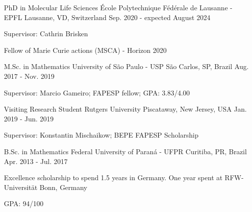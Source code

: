 

\begin{cventries}

  \cventry
    {PhD in Molecular Life Sciences} %
    {École Polytechnique Fédérale de Lausanne - EPFL} %
    {Lausanne, VD, Switzerland} %
    {Sep. 2020 - expected August 2024}
    {\begin{cvitems}
        \item{Supervisor: Cathrin Brisken}
        \item{Fellow of Marie Curie actions (MSCA) - Horizon 2020}
     \end{cvitems}
    }


  \cventry
    {M.Sc. in Mathematics} %
    {University of São Paulo - USP} %
    {São Carlos, SP, Brazil} %
    {Aug. 2017 - Nov. 2019}
    {
      \begin{cvitems} %
        \item{Supervisor: Marcio Gameiro; FAPESP fellow; GPA: 3.83/4.00}
      \end{cvitems}
    }

  \cventry
    {Visiting Research Student}
    {Rutgers University}
    {Piscataway, New Jersey, USA}
    {Jan. 2019 - Jun. 2019}
    {
      \begin{cvitems}
        \item{Supervisor: Konstantin Mischaikow; BEPE FAPESP Scholarship}
      \end{cvitems}
    }

  \cventry
    {B.Sc. in Mathematics} %
    {Federal University of Paraná - UFPR} %
    {Curitiba, PR, Brazil} %
    {Apr. 2013 - Jul. 2017} %
    {
      \begin{cvitems} %
        \item{Excellence scholarship to spend 1.5 years in Germany.
              One year spent at RFW-Universität Bonn, Germany}
        \item{GPA: 94/100}
      \end{cvitems}
    }

\end{cventries}
